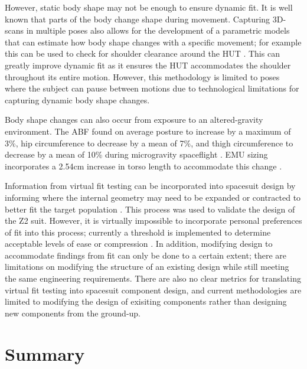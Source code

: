 \documentclass[defaultstyle,11pt]{comps}
\begin{document}
However, static body shape may not be enough to ensure dynamic fit.
It is well known that parts of the body change shape during movement.
Capturing 3D-scans in multiple poses also allows for the development of a parametric models that can estimate how body shape changes with a specific movement; for example this can be used to check for shoulder clearance around the HUT \citep{Kim2016}.
This can greatly improve dynamic fit as it ensures the HUT accommodates the shoulder throughout its entire motion.
However, this methodology is limited to poses where the subject can pause between motions due to technological limitations for capturing dynamic body shape changes.

Body shape changes can also occur from exposure to an altered-gravity environment.
The ABF found on average posture to increase by a maximum of 3\%, hip circumference to decrease by a mean of 7\%, and thigh circumference to decrease by a mean of 10\% during microgravity spaceflight \citep{Kim2019}.
EMU sizing incorporates a 2.54cm increase in torso length to accommodate this change \citep{Thornton1987}.

Information from virtual fit testing can be incorporated into spacesuit design by informing where the internal geometry may need to be expanded or contracted to better fit the target population \citep{Kim2019}.
This process was used to validate the design of the Z2 suit.
However, it is virtually impossible to incorporate personal preferences of fit into this process; currently a threshold is implemented to determine acceptable levels of ease or compression \citep{Kim2019}.
In addition, modifying design to accommodate findings from fit can only be done to a certain extent; there are limitations on modifying the structure of an existing design while still meeting the same engineering requirements.
There are also no clear metrics for translating virtual fit testing into spacesuit component design, and current methodologies are limited to modifying the design of exisiting components rather than designing new components from the ground-up.

\hypertarget{summary-1}{%
\section{Summary}\label{summary-1}}
\end{document}
